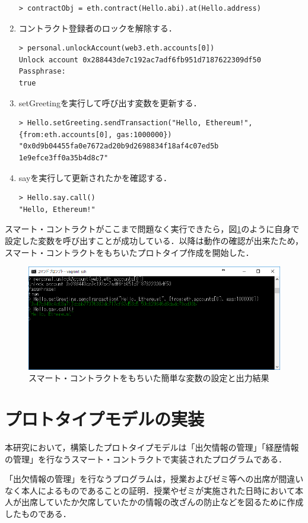 \begin{enumerate}
\begin{verbatim}
> contractObj = eth.contract(Hello.abi).at(Hello.address)
\end{verbatim}
\item コントラクト登録者のロックを解除する．
\begin{verbatim}
> personal.unlockAccount(web3.eth.accounts[0])
Unlock account 0x288443de7c192ac7adf6fb951d7187622309df50
Passphrase:
true
\end{verbatim}
\item setGreetingを実行して呼び出す変数を更新する．
\begin{verbatim}
> Hello.setGreeting.sendTransaction("Hello, Ethereum!", 
{from:eth.accounts[0], gas:1000000})
"0x0d9b04455fa0e7672ad20b9d2698834f18af4c07ed5b
1e9efce3ff0a35b4d8c7"
\end{verbatim}
\item sayを実行して更新されたかを確認する．
\begin{verbatim}
> Hello.say.call()
"Hello, Ethereum!"
\end{verbatim}
\end{enumerate}

スマート・コントラクトがここまで問題なく実行できたら，図\ref{hello}のように自身で設定した変数を呼び出すことが成功している．以降は動作の確認が出来たため，スマート・コントラクトをもちいたプロトタイプ作成を開始した．
\begin{figure}[htb]
\centering
\includegraphics[width=12cm]{images/hello.png}
\caption{スマート・コントラクトをもちいた簡単な変数の設定と出力結果}\label{hello}
\end{figure}
\newpage

\section{プロトタイプモデルの実装}
本研究において，構築したプロトタイプモデルは「出欠情報の管理」「経歴情報の管理」を行なうスマート・コントラクトで実装されたプログラムである．

「出欠情報の管理」を行なうプログラムは，授業およびゼミ等への出席が間違いなく本人によるものであることの証明．授業やゼミが実施された日時において本人が出席していたか欠席していたかの情報の改ざんの防止などを図るために作成したものである．

